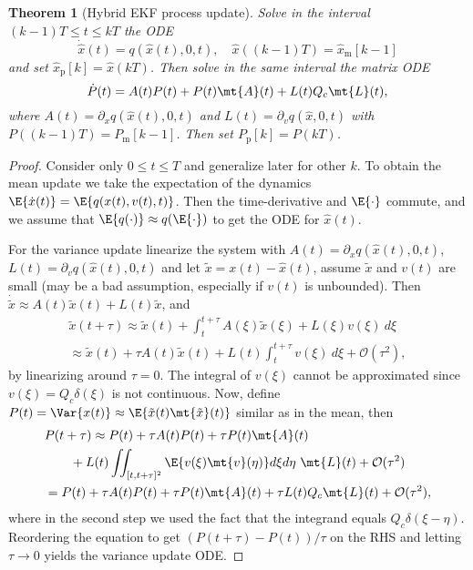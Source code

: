 \documentclass[margin=tiny]{hsrzf}
\theoremstyle{plain}
\newtheorem{thm}{Theorem}[section]
\theoremstyle{definition}
\theoremstyle{remark}
\begin{document}
\begin{thm}[Hybrid EKF process update]
  Solve in the interval $(k-1)T \leq t \leq kT$ the ODE
  \[
    \dot{\hat{x}}(t) = q(\hat{x}(t), 0, t), 
    \quad \hat{x}((k-1)T) = \hat{x}_\mathrm{m}[k-1]
  \]
  and set $\hat{x}_\mathrm{p}[k] = \hat{x}(kT)$. Then solve in the same
  interval the matrix ODE
  \[
    \dot{P}(t) = A(t)P(t) + P(t) \mt{A}(t) + L(t) Q_c \mt{L}(t),
  \]
  where $A(t) = \partial_x q(\hat{x}(t), 0, t)$ and $L(t) = \partial_v
  q(\hat{x}, 0, t)$ with $P((k-1)T) = P_\mathrm{m}[k-1]$. Then set
  $P_\mathrm{p}[k] = P(kT)$.
\end{thm}
\begin{proof}[Proof]
  Consider only $0 \leq t \leq T$ and generalize later for other $k$. To obtain
  the mean update we take the expectation of the dynamics $\E{\dot{x}(t)} =
  \E{q(x(t), v(t), t)}$. Then the time-derivative and $\E{\cdot}$ commute, and
  we assume that $\E{q(\cdot)} \approx q(\E{\cdot})$ to get the ODE for
  $\hat{x}(t)$.

  For the variance update linearize the system with $A(t) = \partial_x
  q(\hat{x}(t), 0, t)$, $L(t) = \partial_v q(\hat{x}(t), 0, t)$ and let
  $\tilde{x} = x(t) - \hat{x}(t)$, assume $\tilde{x}$ and $v(t)$ are small
  (may be a bad assumption, especially if $v(t)$ is unbounded). Then
  $\dot{\tilde{x}} \approx A(t) \tilde{x}(t) + L(t)\tilde{x}$, and
  \begin{gather*}
    \tilde{x}(t + \tau) \approx \tilde{x}(t) + \int_t^{t + \tau}
      A(\xi)\tilde{x}(\xi) + L(\xi) v(\xi) ~ d\xi \\
      \approx \tilde{x}(t) + \tau A(t) \tilde{x}(t) + L(t) \int_t^{t + \tau}
        v(\xi) ~ d\xi + \mathcal{O}(\tau^2),
  \end{gather*}
  by linearizing around $\tau = 0$. The integral of $v(\xi)$ cannot be
  approximated since $v(\xi) = Q_c\delta(\xi)$ is not continuous. Now, define
  $P(t) = \Var{x(t)} \approx \E{\tilde{x}(t) \mt{\tilde{x}}(t)}$ similar as in
  the mean, then
  \begin{align*}
    &P(t + \tau) \approx P(t) + \tau A(t) P(t) + \tau P(t) \mt{A}(t) \\
      &\qquad + L(t) \iint_{[t, t + \tau]^2} \E{v(\xi)\mt{v}(\eta)} d\xi d\eta ~\mt{L}(t)
      + \mathcal{O}(\tau^2) \\
    &= P(t) + \tau A(t) P(t) + \tau P(t) \mt{A}(t)
      + \tau L(t) Q_c \mt{L}(t) + \mathcal{O}(\tau^2),
  \end{align*}
  where in the second step we used the fact that the integrand equals $Q_c
  \delta(\xi - \eta)$. Reordering the equation to get $(P(t + \tau) - P(t)) /
  \tau$ on the RHS and letting $\tau \to 0$ yields the variance update ODE.
\end{proof}
\end{document}
